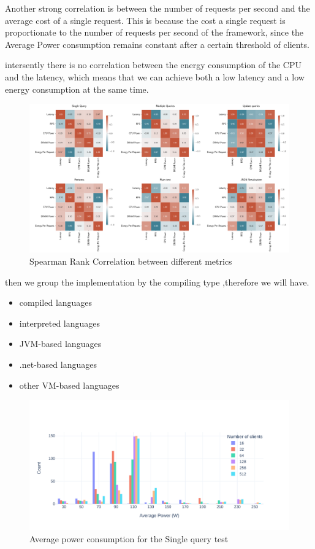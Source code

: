 Another strong correlation is between the number of requests per second and the average cost of a single request. This is because the cost a single request is proportionate to the number of requests per second of the framework, since the Average Power consumption remains constant after a certain threshold of clients. 




intersently there is no correlation between the energy consumption of the CPU and the latency, which means that we can achieve both a low latency and a low energy consumption at the same time. 
\begin{figure}[bht]
    \centering
    \includegraphics[width=.8\columnwidth ]{imgs/correlation_all}
    \caption{Spearman Rank Correlation between different metrics}
    \label{fig:correlation}
\end{figure}


then we group the implementation by the compiling type ,therefore we will have.
\begin{itemize}
    \item compiled languages 
    \item interpreted languages
    \item JVM-based languages 
    \item .net-based languages
    \item other VM-based languages
\end{itemize}


\begin{figure}[bht]
    \centering
    \caption{Average power consumption for the Single query test}
    \label{fig:av_power_db}
    \includegraphics[width=.8\columnwidth]{imgs/av_power_db}

\end{figure}


